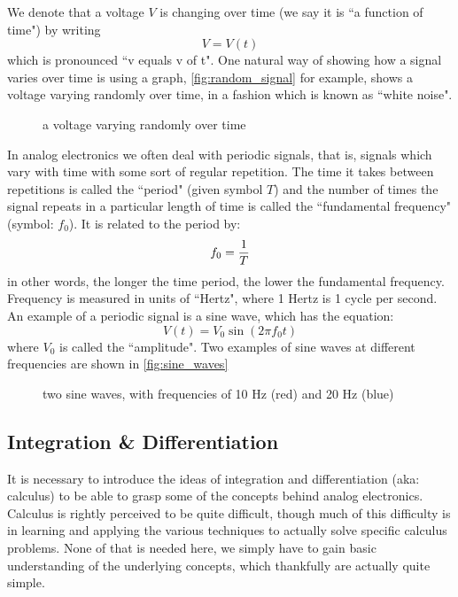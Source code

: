 \documentclass{memoir}
\begin{document}
	We denote that a voltage $V$ is changing over time (we say it is ``a function of time") by writing 
	\begin{equation}
		V=V\left(t\right)
	\end{equation}
	which is pronounced ``v equals v of t". One natural way of showing how a signal varies over time is using a graph, \autoref{fig:random_signal} for example, shows a voltage varying randomly over time, in a fashion which is known as ``white noise".
	\begin{figure}
		\caption{\label{fig:random_signal}a voltage varying randomly over time}
	\end{figure}
	
	In analog electronics we often deal with periodic signals, that is, signals which vary with time with some sort of regular repetition. The time it takes between repetitions is called the ``period" (given symbol $T$) and the number of times the signal repeats in a particular length of time is called the ``fundamental frequency" (symbol: $f_0$). It is related to the period by:
	\begin{equation}
		f_0 = {1 \over T }
	\end{equation}
	in other words, the longer the time period, the lower the fundamental frequency. Frequency is measured in units of ``Hertz", where 1 Hertz is 1 cycle per second. An example of a periodic signal is a sine wave, which has the equation:
	\begin{equation}
		V\left(t\right) = V_0 \sin\left(2 \pi f_0  t\right)
	\end{equation} 
	where $V_0$ is called the ``amplitude". Two examples of sine waves at different frequencies are shown in \autoref{fig:sine_waves}
	
	\begin{figure}
		\caption{\label{fig:sine_waves}two sine waves, with frequencies of 10 Hz (red) and 20 Hz (blue)}
	\end{figure}
	
	\subsection{Integration \& Differentiation}
	It is necessary to introduce the ideas of integration and differentiation (aka: calculus) to be able to grasp some of the concepts behind analog electronics. Calculus is rightly perceived to be quite difficult, though much of this difficulty is in learning and applying the various techniques to actually solve specific calculus problems. None of that is needed here, we simply have to gain basic understanding of the underlying concepts, which thankfully are actually quite simple. 
\end{document}
